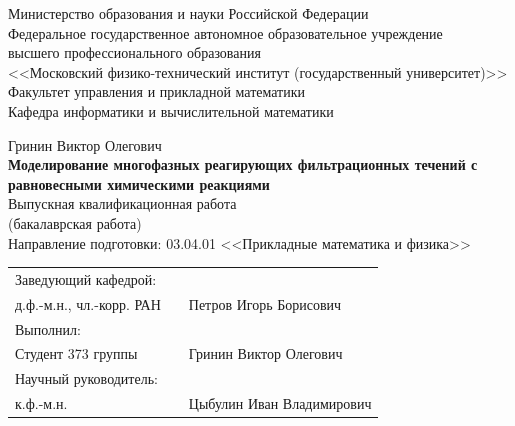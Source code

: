 \documentclass[14pt,a4paper]{extarticle}
\begin{document}
\thispagestyle{empty}


\begin{center}
	Министерство образования и науки Российской Федерации\\[6pt]
	
	Федеральное государственное автономное образовательное учреждение\\
	высшего профессионального образования\\
	<<Московский физико-технический институт (государственный университет)>>\\[6pt]
	
	Факультет управления и прикладной математики\\[6pt]
	Кафедра информатики и вычислительной математики\\[6pt]	
\end{center} 
\vspace{20mm}
\begin{center}
	Гринин Виктор Олегович\\[6pt]
	
	{\large {\bf Моделирование многофазных реагирующих фильтрационных течений с равновесными химическими реакциями}}\\[6pt]
	
	Выпускная квалификационная работа\\
	(бакалаврская работа)\\
	
	Направление подготовки: 03.04.01 <<Прикладные математика и физика>>
\end{center}

\vspace{20mm}

\begin{flushleft}
	\begin{tabularx}{\textwidth}{lcl}
		Заведующий кафедрой: \\
		д.ф.-м.н., чл.-корр. РАН  & \raisebox{-3pt}{\rule{4cm}{0.5pt}} & Петров Игорь Борисович \\[5mm]
	
		Выполнил: \\
		Студент 373 группы  & \raisebox{-3pt}{\rule{4cm}{0.5pt}} & Гринин Виктор Олегович \\[5mm]
		
		Научный руководитель:\\
		к.ф.-м.н. & \raisebox{-3pt}{\rule{4cm}{0.5pt}} & Цыбулин Иван Владимирович \\[5mm]
	\end{tabularx}
\end{flushleft}
\end{document}
